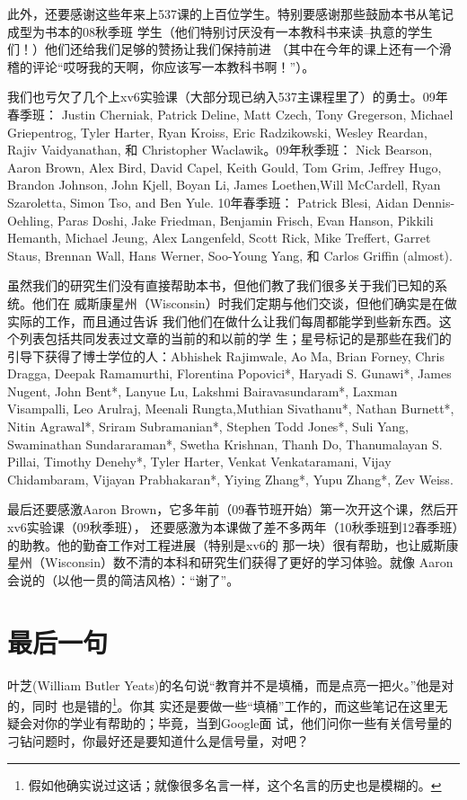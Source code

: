 此外，还要感谢这些年来上537课的上百位学生。特别要感谢那些鼓励本书从笔记成型为书本的08秋季班
学生（他们特别讨厌没有一本教科书来读--执意的学生们！）他们还给我们足够的赞扬让我们保持前进
（其中在今年的课上还有一个滑稽的评论“哎呀我的天啊，你应该写一本教科书啊！”）。

我们也亏欠了几个上xv6实验课（大部分现已纳入537主课程里了）的勇士。09年春季班： 
Justin Cherniak, Patrick Deline, Matt Czech, Tony Gregerson, Michael Griepentrog, 
Tyler Harter, Ryan Kroiss, Eric Radzikowski, Wesley Reardan, Rajiv Vaidyanathan, 
和 Christopher Waclawik。09年秋季班： Nick Bearson, Aaron  Brown, Alex Bird, 
David Capel, Keith Gould, Tom Grim, Jeffrey Hugo, Brandon Johnson, John Kjell, 
Boyan Li, James Loethen,Will McCardell, Ryan Szaroletta, Simon Tso, and Ben Yule.
10年春季班： Patrick Blesi, Aidan Dennis-Oehling, Paras Doshi, Jake Friedman, 
Benjamin Frisch, Evan Hanson, Pikkili Hemanth, Michael Jeung, Alex Langenfeld, 
Scott Rick, Mike Treffert, Garret Staus, Brennan Wall, Hans Werner, Soo-Young Yang, 
和 Carlos Griffin (almost).

虽然我们的研究生们没有直接帮助本书，但他们教了我们很多关于我们已知的系统。他们在
威斯康星州（Wisconsin）时我们定期与他们交谈，但他们确实是在做实际的工作，而且通过告诉
我们他们在做什么让我们每周都能学到些新东西。这个列表包括共同发表过文章的当前的和以前的学
生；星号标记的是那些在我们的引导下获得了博士学位的人：Abhishek Rajimwale, Ao Ma, 
Brian Forney, Chris Dragga, Deepak Ramamurthi, Florentina Popovici*, 
Haryadi S. Gunawi*, James Nugent, John Bent*, Lanyue Lu, Lakshmi Bairavasundaram*, 
Laxman Visampalli, Leo Arulraj, Meenali Rungta,Muthian Sivathanu*, 
Nathan Burnett*, Nitin Agrawal*, Sriram Subramanian*, Stephen Todd Jones*, 
Suli Yang, Swaminathan Sundararaman*, Swetha Krishnan, Thanh Do, 
Thanumalayan S. Pillai, Timothy Denehy*, Tyler Harter, Venkat Venkataramani, 
Vijay Chidambaram, Vijayan Prabhakaran*, Yiying Zhang*, Yupu Zhang*, Zev Weiss.

最后还要感激Aaron Brown，它多年前（09春节班开始）第一次开这个课，然后开xv6实验课（09秋季班），
还要感激为本课做了差不多两年（10秋季班到12春季班）的助教。他的勤奋工作对工程进展（特别是xv6的
那一块）很有帮助，也让威斯康星州（Wisconsin）数不清的本科和研究生们获得了更好的学习体验。就像
Aaron会说的（以他一贯的简洁风格）：“谢了”。
\clearpage

{}
\section*{最后一句}
叶芝(William Butler Yeats)的名句说“教育并不是填桶，而是点亮一把火。”他是对的，同时
也是错的\footnote{假如他确实说过这话；就像很多名言一样，这个名言的历史也是模糊的。}。你其
实还是要做一些“填桶”工作的，而这些笔记在这里无疑会对你的学业有帮助的；毕竟，当到Google面
试，他们问你一些有关信号量的刁钻问题时，你最好还是要知道什么是信号量，对吧？

